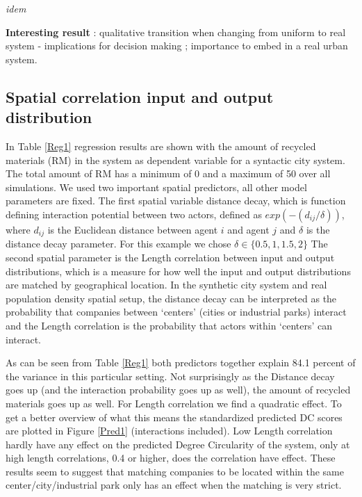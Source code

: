\documentclass[fleqn,10pt]{wlscirep}
\begin{document}
{\textit{idem}

\textbf{Interesting result} : qualitative transition when changing from uniform to real system - implications for decision making ; importance to embed in a real urban system.



\subsection*{Spatial correlation input and output distribution}
In Table \ref{Reg1} regression results are shown with the amount of recycled materials (RM) in the system as dependent variable for a syntactic city system. The total amount of RM has a minimum of 0 and a maximum of 50 over all simulations. We used two important spatial predictors, all other model parameters are fixed. The first spatial variable distance decay, which is function defining interaction potential between two actors, defined as $exp(-(d_{ij}/\delta))$, where $d_{ij}$ is the Euclidean distance between agent $i$ and agent $j$ and $\delta$ is the distance decay parameter. For this example we chose $\delta \in \{0.5, 1, 1.5, 2\}$ The second spatial parameter is the Length correlation between input and output distributions, which is a measure for how well the input and output distributions are matched by geographical location. In the synthetic city system and real population density spatial setup, the distance decay can be interpreted as the probability that companies between `centers' (cities or industrial parks) interact and the Length correlation is the probability that actors within `centers' can interact. 

As can be seen from Table \ref{Reg1} both predictors together explain 84.1 percent of the variance in this particular setting. Not surprisingly as the Distance decay goes up (and the interaction probability goes up as well), the amount of recycled materials goes up as well. For Length correlation we find a quadratic effect. To get a better overview of what this means the standardized predicted DC scores are plotted in Figure \ref{Pred1} (interactions included). Low Length correlation hardly have any effect on the predicted Degree Circularity of the system, only at high length correlations, 0.4 or higher, does the correlation have effect. These results seem to suggest that matching companies to be located within the same center/city/industrial park only has an effect when the matching is very strict.  

}
\end{document}
